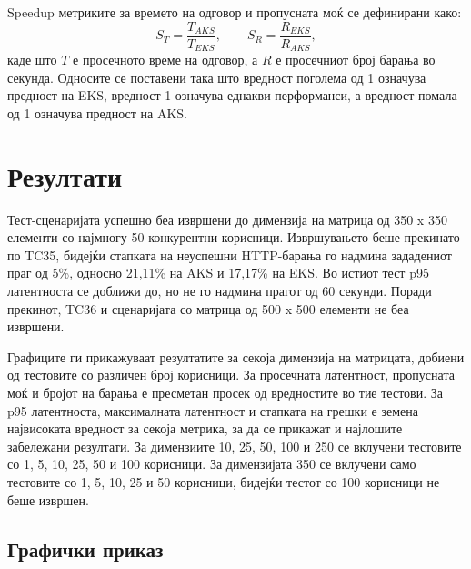 \documentclass{article}
\begin{document}
Speedup метриките за времето на одговор и пропусната моќ се дефинирани како:
\[
S_T = \frac{T_{AKS}}{T_{EKS}},
\qquad
S_R = \frac{R_{EKS}}{R_{AKS}},
\]
каде што \(T\) е просечното време на одговор, а \(R\) е просечниот број барања во секунда. Односите се поставени така што вредност поголема од 1 означува предност на EKS, вредност 1 означува еднакви перформанси, а вредност помала од 1 означува предност на AKS.


\section{Резултати}

Тест-сценаријата успешно беа извршени до димензија на матрица од 350 x 350 елементи со најмногу 50 конкурентни корисници. Извршувањето беше прекинато по TC35, бидејќи стапката на неуспешни HTTP-барања го надмина зададениот праг од 5\%, односно 21,11\% на AKS и 17,17\% на EKS. Во истиот тест p95 латентноста се доближи до, но не го надмина прагот од 60 секунди. Поради прекинот, TC36 и сценаријата со матрица од 500 x 500 елементи не беа извршени.

Графиците ги прикажуваат резултатите за секоја димензија на матрицата, добиени од тестовите со различен број корисници. За просечната латентност, пропусната моќ и бројот на барања е пресметан просек од вредностите во тие тестови. За p95 латентноста, максималната латентност и стапката на грешки е земена највисоката вредност за секоја метрика, за да се прикажат и најлошите забележани резултати.
За димензиите 10, 25, 50, 100 и 250 се вклучени тестовите со 1, 5, 10, 25, 50 и 100 корисници. За димензијата 350 се вклучени само тестовите со 1, 5, 10, 25 и 50 корисници, бидејќи тестот со 100 корисници не беше извршен.

\subsection{Графички приказ}
\end{document}
